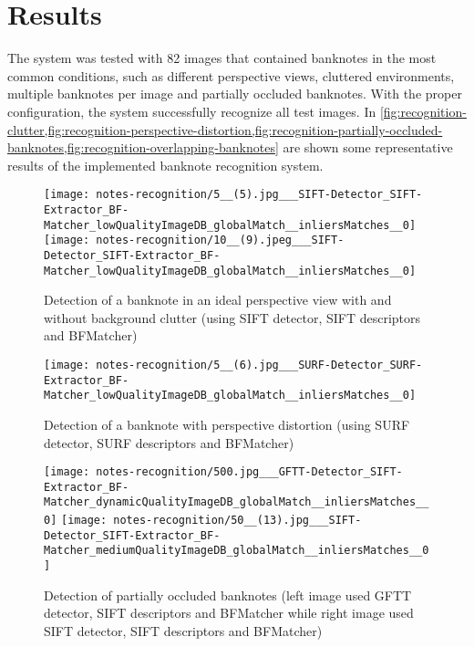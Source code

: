 \section{Results}\label{sec:results}

The system was tested with 82 images that contained banknotes in the most common conditions, such as different perspective views, cluttered environments, multiple banknotes per image and partially occluded banknotes. With the proper configuration, the system successfully recognize all test images. In \cref{fig:recognition-clutter,fig:recognition-perspective-distortion,fig:recognition-partially-occluded-banknotes,fig:recognition-overlapping-banknotes} are shown some representative results of the implemented banknote recognition system.

\begin{figure}[H]
	\centering
	\texttt{[image: notes-recognition/5\_\_(5).jpg\_\_\_SIFT-Detector\_SIFT-Extractor\_BF-Matcher\_lowQualityImageDB\_globalMatch\_\_inliersMatches\_\_0]}\hfill
	\texttt{[image: notes-recognition/10\_\_(9).jpeg\_\_\_SIFT-Detector\_SIFT-Extractor\_BF-Matcher\_lowQualityImageDB\_globalMatch\_\_inliersMatches\_\_0]}
	\caption{Detection of a banknote in an ideal perspective view with and without background clutter (using SIFT detector, SIFT descriptors and BFMatcher)}
	\label{fig:recognition-clutter}
\end{figure}

\begin{figure}[H]
	\centering
	\texttt{[image: notes-recognition/5\_\_(6).jpg\_\_\_SURF-Detector\_SURF-Extractor\_BF-Matcher\_lowQualityImageDB\_globalMatch\_\_inliersMatches\_\_0]}
	\caption{Detection of a banknote with perspective distortion (using SURF detector, SURF descriptors and BFMatcher)}
	\label{fig:recognition-perspective-distortion}
\end{figure}

\begin{figure}[H]
	\centering
	\texttt{[image: notes-recognition/500.jpg\_\_\_GFTT-Detector\_SIFT-Extractor\_BF-Matcher\_dynamicQualityImageDB\_globalMatch\_\_inliersMatches\_\_0]}\hfill
	\texttt{[image: notes-recognition/50\_\_(13).jpg\_\_\_SIFT-Detector\_SIFT-Extractor\_BF-Matcher\_mediumQualityImageDB\_globalMatch\_\_inliersMatches\_\_0]}
	\caption{Detection of partially occluded banknotes (left image used GFTT detector, SIFT descriptors and BFMatcher while right image used SIFT detector, SIFT descriptors and BFMatcher)}
	\label{fig:recognition-partially-occluded-banknotes}
\end{figure}

